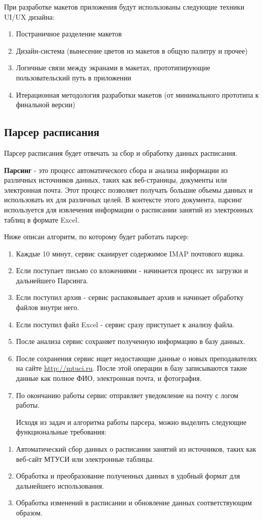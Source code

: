 При разработке макетов приложения будут использованы следующие техники UI/UX дизайна:
\begin{enumerate}
  \item Постраничное разделение макетов
  \item Дизайн-система (вынесение цветов из макетов в общую палитру и прочее)
  \item Логичные связи между экранами в макетах, прототипирующие пользовательский путь в приложении
  \item Итерационная методология разработки макетов (от минимального прототипа к финальной версии)
\end{enumerate}


\subsection{Парсер расписания}
Парсер расписания будет отвечать за сбор и обработку данных расписания.

\textbf{Парсинг} - это процесс автоматического сбора и анализа информации из различных источников данных,
таких как веб-страницы, документы или электронная почта.
Этот процесс позволяет получать большие объемы данных и использовать их для различных целей.
В контексте этого документа, парсинг используется для извлечения информации о
расписании занятий из электронных таблиц в формате Excel.

Ниже описан алгоритм, по которому будет работать парсер:
\begin{enumerate}
  \item Каждые 10 минут, сервис сканирует содержимое IMAP почтового ящика.
  \item Если поступает письмо со вложениями - начинается процесс их загрузки и дальнейшего Парсинга.
  \item Если поступил архив - сервис распаковывает архив и начинает обработку файлов внутри него.
  \item Если поступил файл Excel - сервис сразу приступает к анализу файла.
  \item После анализа сервис сохраняет полученную информацию в базу данных.
  \item После сохранения сервис ищет недостающие данные о новых преподавателях на сайте
  \url{http://mtuci.ru}. После этой операции в базу записываются такие данные как полное ФИО,
  электронная почта, и фотография.
  \item По окончанию работы сервис отправляет уведомление на почту с логом работы.

  Исходя из задач и алгоритма работы парсера, можно выделить следующие функциональные требования:
\end{enumerate}
\begin{enumerate}
  \item Автоматический сбор данных о расписании занятий из источников, таких как веб-сайт МТУСИ или электронные таблицы.
  \item Обработка и преобразование полученных данных в удобный формат для дальнейшего использования.
  \item Обработка изменений в расписании и обновление данных соответствующим образом.
\end{enumerate}

